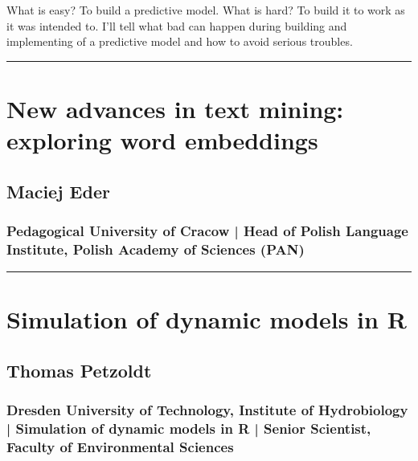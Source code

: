 \documentclass [12pt]{article}
\begin{document}
What is easy? To build a predictive model. What is hard? To build it to work as it was intended to. I'll tell what bad can happen during building and implementing of a predictive model and how to avoid serious troubles.

\noindent\rule{\textwidth}{1pt}
\section{New advances in text mining: exploring word embeddings}
\subsection*{Maciej Eder}
\subsubsection*{Pedagogical University of Cracow | Head of Polish Language Institute, Polish Academy of Sciences (PAN)}

\noindent\rule{\textwidth}{1pt}
\section{Simulation of dynamic models in R}
\subsection*{Thomas Petzoldt}
\subsubsection*{Dresden University of Technology, Institute of Hydrobiology | Simulation of dynamic models in R | Senior Scientist, Faculty of Environmental Sciences}
\end{document}

